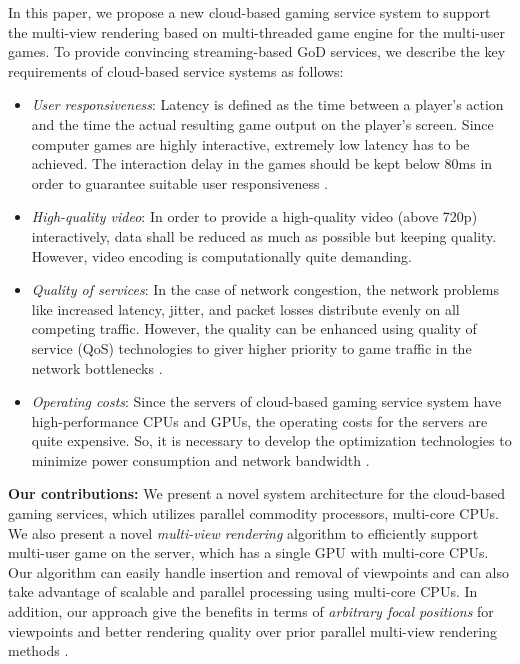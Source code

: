 \documentclass[conference]{IEEEtran}
\newcommand{\bi}{\begin{itemize}}
\newcommand{\ei}{\end{itemize}}
\newcommand{\ii}{\item}
\begin{document}
    In this paper, we propose a new cloud-based gaming service system to support the multi-view rendering based on multi-threaded game engine \cite{Smoke:2009} for the multi-user games.
    To provide convincing streaming-based GoD services, we describe the key requirements of cloud-based service systems as follows:
    \bi
    \ii \emph{User responsiveness}: Latency is defined as the time between a player's action and the time the actual resulting game output on the player's screen. Since computer games are highly interactive, extremely low latency has to be achieved.
    The interaction delay in the games should be kept below 80ms in order to guarantee suitable user responsiveness \cite{Claypool:2006}.
    \ii \emph{High-quality video}: In order to provide a high-quality video (above 720p) interactively, data shall be reduced as much as possible but keeping quality. However, video encoding is computationally quite demanding.
    \ii \emph{Quality of services}: In the case of network congestion, the network problems like increased latency, jitter, and packet losses distribute evenly on all competing traffic. However, the quality can be enhanced using quality of service (QoS) technologies to giver higher priority to game traffic in the network bottlenecks \cite{Jurgelionis:2010}.
    \ii \emph{Operating costs}: Since the servers of cloud-based gaming service system have high-performance CPUs and GPUs, the operating costs for the servers are quite expensive. So, it is necessary to develop the optimization technologies to minimize power consumption and network bandwidth \cite{Perlman:2009}.
    \ei

    \noindent
    \textbf{Our contributions:} We present a novel system architecture for the cloud-based gaming services, which utilizes parallel commodity processors, multi-core CPUs.
    We also present a novel \emph{multi-view rendering} algorithm to efficiently support multi-user game on the server, which has a single GPU with multi-core CPUs.
    Our algorithm can easily handle insertion and removal of viewpoints and can also take advantage of scalable and parallel processing using multi-core CPUs.
    In addition, our approach give the benefits in terms of \emph{arbitrary focal positions} for viewpoints and better rendering quality over prior parallel multi-view rendering methods \cite{Lages:2008}.
\end{document}
